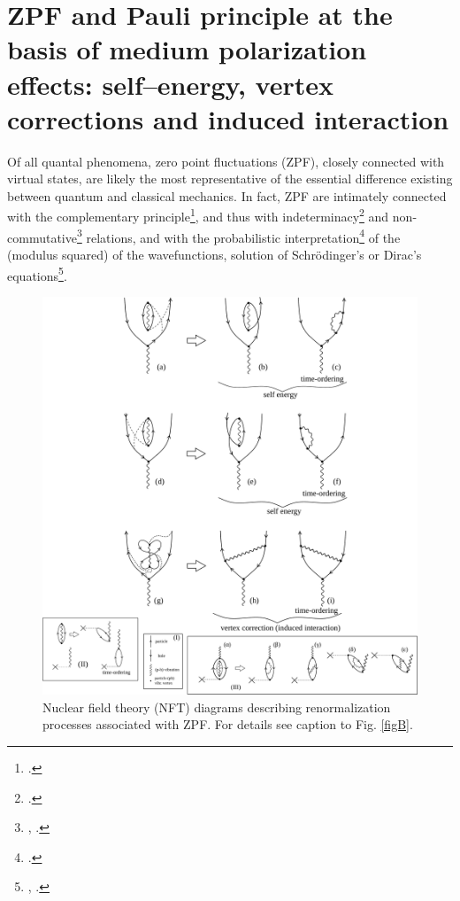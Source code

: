 \section[ZPF and Pauli principle]{ZPF and Pauli principle at the basis of medium polarization effects: self--energy, vertex corrections and induced interaction}\label{C7AppA}
Of all quantal phenomena, zero point fluctuations (ZPF), closely connected with virtual states, are likely the  most representative of the essential difference existing between quantum and classical mechanics. In fact, ZPF are intimately connected with the complementary principle\footnote{\cite{Bohr:28}.}, and thus with  indeterminacy\footnote{\cite{Heisenberg:27}.} and non-commutative\footnote{\cite{Born:25a}, \cite{Born:25b}.} relations, and with the probabilistic interpretation\footnote{ \cite{Born:26}.} of the (modulus squared) of the wavefunctions, solution of Schr\"odinger's or Dirac's equations\footnote{\cite{Schrodinger:25}, \cite{Dirac:26}.}.
 \begin{figure}[h!]
 	\begin{center}
\includegraphics*[width=1.2\textwidth]{C7/figs_C7/FigA.pdf}
\end{center}
\caption{Nuclear field theory (NFT) diagrams describing renormalization processes associated with ZPF. For details see caption to Fig. \ref{figB}.}\label{figA}
\end{figure}
